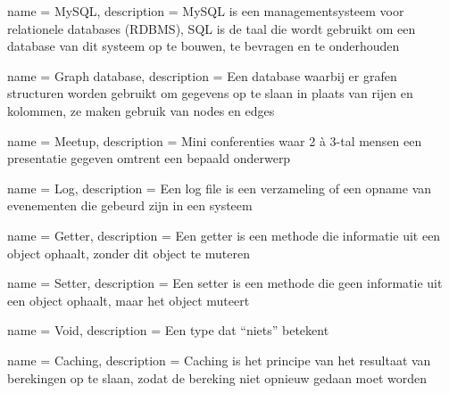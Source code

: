 


{
  name = MySQL,
  description = {MySQL is een managementsysteem voor relationele databases (\gls{RDBMS}), SQL is de taal die wordt gebruikt om een database van dit systeem op te bouwen, te bevragen en te onderhouden}
}

{
  name = {Graph database},
  description = {Een database waarbij er grafen structuren worden gebruikt om gegevens op te slaan in plaats van rijen en kolommen, ze maken gebruik van nodes en edges}
}

{
  name = Meetup,
  description = {Mini conferenties waar 2 à 3-tal mensen een presentatie gegeven omtrent een bepaald onderwerp}
}

{
  name = Log,
  description = {Een log file is een verzameling of een opname van evenementen die gebeurd zijn in een systeem}
}

{
  name = Getter,
  description = {Een getter is een methode die informatie uit een object ophaalt, zonder dit object te muteren}
}

{
  name = Setter,
  description = {Een setter is een methode die geen informatie uit een object ophaalt, maar het object muteert}
}

{
  name = Void,
  description = {Een type dat ``niets'' betekent}
}

{
  name = Caching,
  description = {Caching is het principe van het resultaat van berekingen op te slaan, zodat de bereking niet opnieuw gedaan moet worden}
}

